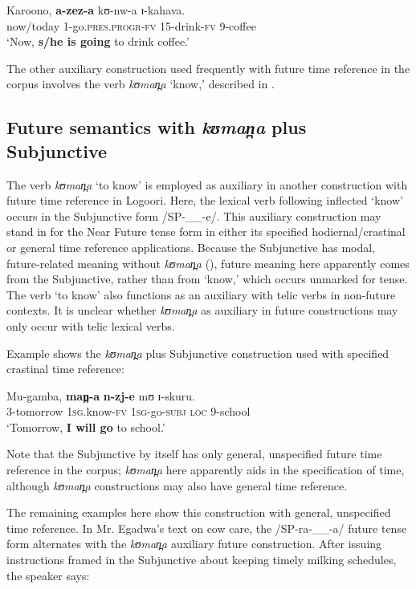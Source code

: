 \documentclass[output=paper]{langsci/langscibook}
\begin{document}
\ea\label{ex:sarvasy:19}
\gll Karoono,   \textbf{a-zez-a}      kʊ-nw-a  ɪ-kahava. \\
now/today  1-go.\textsc{pres.progr-fv}  15-drink-\textsc{fv}  9-coffee \\
\glt ‘Now, \textbf{s/he is going} to drink coffee.’
\z

The other auxiliary construction used frequently with future time reference in the corpus involves the verb \textit{kʊman̪a} ‘know,’ described in .

\subsection{Future semantics with \textit{k}\textit{ʊman̪a}\textit{} plus Subjunctive} \label{sec:sarvasy:7.3}

The verb \textit{kʊman̪a} ‘to know’ is employed as auxiliary in another construction with future time reference in Logoori. Here, the lexical verb following inflected ‘know’ occurs in the Subjunctive form /SP-\_\_-e/. This auxiliary construction may stand in for the Near Future tense form in either its specified hodiernal/crastinal or general time reference applications. Because the Subjunctive has modal, future-related meaning without \textit{kʊman̪a} (), future meaning here apparently comes from the Subjunctive, rather than from ‘know,’ which occurs unmarked for tense. The verb ‘to know’ also functions as an auxiliary with telic verbs in non-future contexts. It is unclear whether \textit{kʊman̪a} as auxiliary in future constructions may only occur with telic lexical verbs.

Example  shows the \textit{kʊman̪a} plus Subjunctive construction used with specified crastinal time reference:

\ea\label{ex:sarvasy:20}
\gll Mu-gamba,   \textbf{man̪-a}    \textbf{n-zj-e}    mʊ  ɪ-skuru. \\
3-tomorrow  \textsc{1sg.}know-\textsc{fv}  \textsc{1sg}-go-\textsc{subj}  \textsc{loc}  9-school \\
\glt ‘Tomorrow, \textbf{I will go} to school.’
\z

Note that the Subjunctive by itself has only general, unspecified future time reference in the corpus; \textit{kʊman̪a} here apparently aids in the specification of time, although \textit{kʊman̪a} constructions may also have general time reference. 

The remaining examples here show this construction with general, unspecified time reference. In Mr. Egadwa’s text on cow care, the /SP-ra-\_\_-a/ future tense form alternates with the \textit{kʊman̪a} auxiliary future construction. After issuing instructions framed in the Subjunctive about keeping timely milking schedules, the speaker says: 
\end{document}
